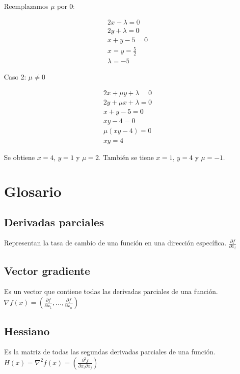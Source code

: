 \documentclass{article}
\newenvironment{solution}
{\begin{mdframed}[backgroundcolor=lightorange,hidealllines=true]}
{\end{mdframed}}
\begin{document}
\begin{solution}
    Reemplazamos $\mu$ por $0$:

    \begin{align*}
        2x + \lambda = 0\\
        2y + \lambda = 0\\
        x + y - 5 = 0\\
        x=y= \frac{5}{2}\\
        \lambda = -5
    \end{align*}

    Caso 2: $\mu \neq 0$

    \begin{align*}
        2x + \mu y + \lambda = 0\\
        2y + \mu x + \lambda = 0\\
        x + y - 5 = 0\\
        xy - 4 = 0\\
        \mu(xy-4) = 0\\
        xy = 4
    \end{align*}
    
    Se obtiene $x=4$, $y=1$ y $\mu = 2$. También se tiene $x=1$, $y=4$ y $\mu = -1$.

\end{solution}

\section{Glosario}

\subsection*{Derivadas parciales}

Representan la tasa de cambio de una función en una dirección específica. $\frac{\partial f}{\partial x_i}$

\subsection*{Vector gradiente}

Es un vector que contiene todas las derivadas parciales de una función. $\nabla f(x) = \left( \frac{\partial f}{\partial x_1}, \ldots, \frac{\partial f}{\partial x_n} \right)$

\subsection*{Hessiano}

Es la matriz de todas las segundas derivadas parciales de una función. $H(x)=\nabla^2f(x) = \left( \frac{\partial^2 f}{\partial x_i \partial x_j} \right)$ 
\end{document}
